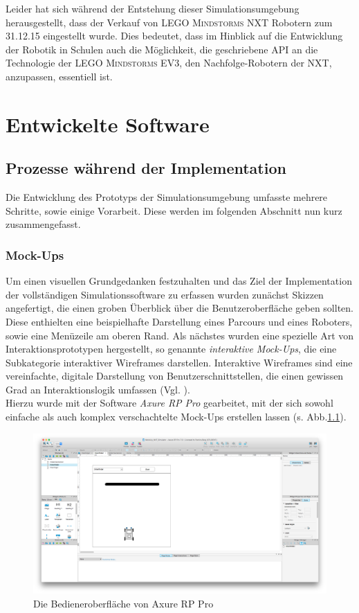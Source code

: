 \documentclass[paper=a4, pagesize, DIV=calc, BCOR=15mm, twoside=on, onecolumn=on, open = right, titlepage =on, parskip =half-, headsepline = on, footsepline = on, chapterprefix = on, appendixprefix = off, fontsize = 12pt, numbers = noenddot, abstract = on]{scrbook}
\numberwithin{equation}{chapter}
\theoremstyle{definition}
\theoremstyle{plain}
\theoremstyle{plain}
\theoremstyle{remark}
\theoremstyle{plain}
\theoremstyle{plain}
\begin{document}
Leider hat sich während der Entstehung dieser Simulationsumgebung herausgestellt, dass der Verkauf von \textsc{LEGO Mindstorms} NXT Robotern zum 31.12.15 eingestellt wurde. Dies bedeutet, dass im Hinblick auf die Entwicklung der Robotik in Schulen auch die Möglichkeit, die geschriebene API an die Technologie der \textsc{LEGO Mindstorms} EV3, den Nachfolge-Robotern der NXT, anzupassen, essentiell ist.


\par \singlespacing
\chapter{Entwickelte Software}
\onehalfspacing
\par \singlespacing
\section{Prozesse während der Implementation}
\onehalfspacing
Die Entwicklung des Prototyps der Simulationsumgebung umfasste mehrere Schritte, sowie einige Vorarbeit. Diese werden im folgenden Abschnitt nun kurz zusammengefasst.
\par \singlespacing
\subsection{Mock-Ups} 
\onehalfspacing
Um einen visuellen Grundgedanken festzuhalten und das Ziel der Implementation der vollständigen Simulationssoftware zu erfassen wurden zunächst Skizzen angefertigt, die einen groben Überblick über die Benutzeroberfläche geben sollten. Diese enthielten eine beispielhafte Darstellung eines Parcours und eines Roboters, sowie eine Menüzeile am oberen Rand. Als nächstes wurden eine spezielle Art von Interaktionsprototypen hergestellt, so genannte \emph{interaktive Mock-Ups}, die eine Subkategorie interaktiver Wireframes darstellen. Interaktive Wireframes sind eine vereinfachte, digitale Darstellung von Benutzerschnittstellen, die einen gewissen Grad an Interaktionslogik umfassen (Vgl. \cite[S.162ff.]{moser:12}).\\
 Hierzu wurde mit der Software \emph{Axure RP Pro} gearbeitet, mit der sich sowohl einfache als auch komplex verschachtelte Mock-Ups erstellen lassen (s. Abb.\ref{fig:axure}).

\begin{figure}[htbp]
\centering
\includegraphics[scale=0.2]{images/axure_mockup.png} 
\caption{Die Bedieneroberfläche von Axure RP Pro}
\label{fig:axure}
\end{figure}
\end{document}
